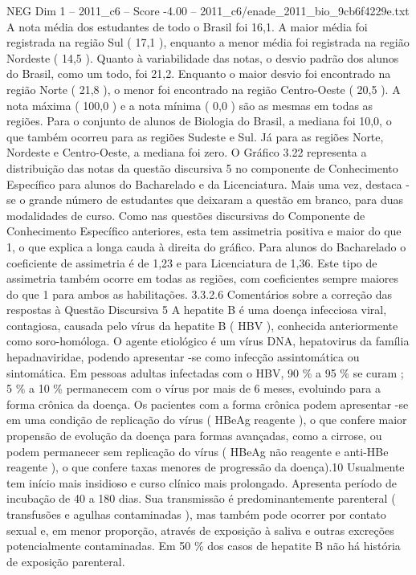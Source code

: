 \begin{textsample}{NEG Dim 1 – 2011\_c6 – Score -4.00 – 2011\_c6/enade\_2011\_bio\_9cb6f4229e.txt}
A nota média dos estudantes de todo o Brasil foi 16,1.
A maior média foi registrada na região Sul ( 17,1 ), enquanto a menor média foi registrada na região Nordeste ( 14,5 ).
Quanto à variabilidade das notas, o desvio padrão dos alunos do Brasil, como um todo, foi 21,2.
Enquanto o maior desvio foi encontrado na região Norte ( 21,8 ), o menor foi encontrado na região Centro-Oeste ( 20,5 ).
A nota máxima ( 100,0 ) e a nota mínima ( 0,0 ) são as mesmas em todas as regiões.
Para o conjunto de alunos de Biologia do Brasil, a mediana foi 10,0, o que também ocorreu para as regiões Sudeste e Sul.
Já para as regiões Norte, Nordeste e Centro-Oeste, a mediana foi zero.
O Gráfico 3.22 representa a distribuição das notas da questão discursiva 5 no componente de Conhecimento Específico para alunos do Bacharelado e da Licenciatura.
Mais uma vez, destaca -se o grande número de estudantes que deixaram a questão em branco, para duas modalidades de curso.
Como nas questões discursivas do Componente de Conhecimento Específico anteriores, esta tem assimetria positiva e maior do que 1, o que explica a longa cauda à direita do gráfico.
Para alunos do Bacharelado o coeficiente de assimetria é de 1,23 e para Licenciatura de 1,36.
Este tipo de assimetria também ocorre em todas as regiões, com coeficientes sempre maiores do que 1 para ambos as habilitações. 3.3.2.6 Comentários sobre a correção das respostas à Questão Discursiva 5 A hepatite B é uma doença infecciosa viral, contagiosa, causada pelo vírus da hepatite B ( HBV ), conhecida anteriormente como soro-homóloga.
O agente etiológico é um vírus DNA, hepatovirus da família hepadnaviridae, podendo apresentar -se como infecção assintomática ou sintomática.
Em pessoas adultas infectadas com o HBV, 90 \% a 95 \% se curam ; 5 \% a 10 \% permanecem com o vírus por mais de 6 meses, evoluindo para a forma crônica da doença.
Os pacientes com a forma crônica podem apresentar -se em uma condição de replicação do vírus ( HBeAg reagente ), o que confere maior propensão de evolução da doença para formas avançadas, como a cirrose, ou podem permanecer sem replicação do vírus ( HBeAg não reagente e anti-HBe reagente ), o que confere taxas menores de progressão da doença).10 Usualmente tem início mais insidioso e curso clínico mais prolongado.
Apresenta período de incubação de 40 a 180 dias.
Sua transmissão é predominantemente parenteral ( transfusões e agulhas contaminadas ), mas também pode ocorrer por contato sexual e, em menor proporção, através de exposição à saliva e outras excreções potencialmente contaminadas.
Em 50 \% dos casos de hepatite B não há história de exposição parenteral.

\end{textsample}
